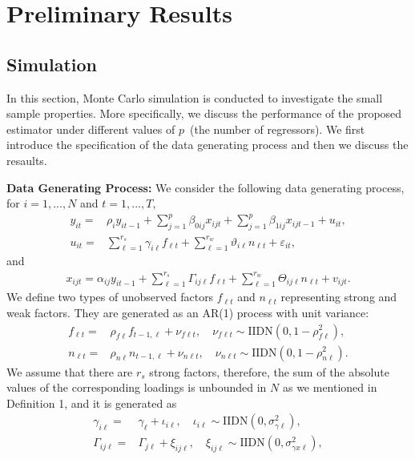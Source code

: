 \documentclass[11pt,a4paper]{article}
\newcommand{\veps}{\varepsilon}
\theoremstyle{definition}
\begin{document}
\section{Preliminary Results}

\subsection{Simulation}
In this section, Monte Carlo simulation is conducted to investigate the small sample properties. More specifically, we discuss the performance of the proposed estimator under different values of $p$~(the number of regressors). We first introduce the specification of the data generating process and then we discuss the resaults.

\noindent
\textbf{Data Generating Process:}
We consider the following data generating process,
for $i=1,...,N$ and $t=1,...,T$,
\begin{align*}
y_{it}=&\rho_iy_{it-1}+\sum_{j=1}^p\beta_{0ij}x_{ijt}+\sum_{j=1}^p\beta_{1ij}x_{ijt-1}+u_{it},\\
u_{it}=&\sum_{\ell=1}^{r_{s}}\gamma_{i\ell}f_{\ell t}+\sum_{\ell=1}^{r_{w}}\vartheta_{i\ell}n_{\ell t}+\veps_{it},
\end{align*}
and
\begin{align*}
x_{ijt}=\alpha_{ij}y_{it-1}+\sum_{\ell=1}^{r_s}\Gamma_{ij\ell}f_{\ell t}+\sum_{\ell=1}^{r_{w}}\Theta_{ij\ell}n_{\ell t}+v_{ijt}.
\end{align*}
We define two types of unobserved factors $f_{\ell t}$ and $n_{\ell t}$ representing strong and weak factors. They are generated  as an AR(1) process with unit variance:
\begin{align*}
f_{\ell t} =&\rho_{f\ell}f_{t-1, \ell} +\nu_{f\ell t},\quad \nu_{f\ell t}\sim \mathrm{IIDN} (0, 1-\rho^{2}_{f\ell}), \\
n_{\ell t} =&\rho_{n\ell}n_{t-1, \ell} +\nu_{n\ell t},\quad \nu_{n\ell t}\sim \mathrm{IIDN} (0, 1-\rho^{2}_{n\ell}).
\end{align*}
We assume that there are $r_{s}$ strong factors, therefore, the sum of the absolute values of the corresponding loadings is unbounded in $N$ as we mentioned in Definition 1, and it is generated as
\begin{align*}
\gamma_{i\ell} =& \gamma_{\ell}+\iota_{i\ell},\quad \iota_{i\ell} \sim \mathrm{IIDN} (0, \sigma^{2}_{\gamma\ell}),\\
\Gamma_{ij\ell} =& \Gamma_{j\ell}+\xi_{ij\ell},\quad \xi_{ij\ell} \sim \mathrm{IIDN} (0, \sigma^{2}_{\gamma x \ell}),
 \end{align*}
\end{document}
